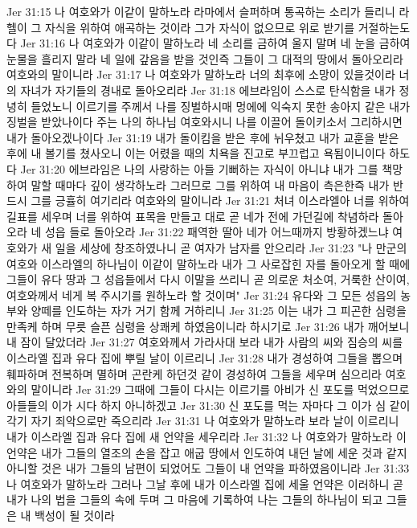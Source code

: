 Jer 31:15  나 여호와가 이같이 말하노라 라마에서 슬퍼하며 통곡하는 소리가 들리니 라헬이 그 자식을 위하여 애곡하는 것이라 그가 자식이 없으므로 위로 받기를 거절하는도다
Jer 31:16  나 여호와가 이같이 말하노라 네 소리를 금하여 울지 말며 네 눈을 금하여 눈물을 흘리지 말라 네 일에 갚음을 받을 것인즉 그들이 그 대적의 땅에서 돌아오리라 여호와의 말이니라
Jer 31:17  나 여호와가 말하노라 너의 최후에 소망이 있을것이라 너의 자녀가 자기들의 경내로 돌아오리라
Jer 31:18  에브라임이 스스로 탄식함을 내가 정녕히 들었노니 이르기를 주께서 나를 징벌하시매 멍에에 익숙지 못한 송아지 같은 내가 징벌을 받았나이다 주는 나의 하나님 여호와시니 나를 이끌어 돌이키소서 그리하시면 내가 돌아오겠나이다
Jer 31:19  내가 돌이킴을 받은 후에 뉘우쳤고 내가 교훈을 받은 후에 내 볼기를 쳤사오니 이는 어렸을 때의 치욕을 진고로 부끄럽고 욕됨이니이다 하도다
Jer 31:20  에브라임은 나의 사랑하는 아들 기뻐하는 자식이 아니냐 내가 그를 책망하여 말할 때마다 깊이 생각하노라 그러므로 그를 위하여 내 마음이 측은한즉 내가 반드시 그를 긍휼히 여기리라 여호와의 말이니라
Jer 31:21  처녀 이스라엘아 너를 위하여 길표를 세우며 너를 위하여 표목을 만들고 대로 곧 네가 전에 가던길에 착념하라 돌아오라 네 성읍 들로 돌아오라
Jer 31:22  패역한 딸아 네가 어느때까지 방황하겠느냐 여호와가 새 일을 세상에 창조하였나니 곧 여자가 남자를 안으리라
Jer 31:23  "나 만군의 여호와 이스라엘의 하나님이 이같이 말하노라 내가 그 사로잡힌 자를 돌아오게 할 때에 그들이 유다 땅과 그 성읍들에서 다시 이말을 쓰리니 곧 의로운 처소여, 거룩한 산이여, 여호와께서 네게 복 주시기를 원하노라 할 것이며"
Jer 31:24  유다와 그 모든 성읍의 농부와 양떼를 인도하는 자가 거기 함께 거하리니
Jer 31:25  이는 내가 그 피곤한 심령을 만족케 하며 무릇 슬픈 심령을 상쾌케 하였음이니라 하시기로
Jer 31:26  내가 깨어보니 내 잠이 달았더라
Jer 31:27  여호와께서 가라사대 보라 내가 사람의 씨와 짐승의 씨를 이스라엘 집과 유다 집에 뿌릴 날이 이르리니
Jer 31:28  내가 경성하여 그들을 뽑으며 훼파하며 전복하며 멸하며 곤란케 하던것 같이 경성하여 그들을 세우며 심으리라 여호와의 말이니라
Jer 31:29  그때에 그들이 다시는 이르기를 아비가 신 포도를 먹었으므로 아들들의 이가 시다 하지 아니하겠고
Jer 31:30  신 포도를 먹는 자마다 그 이가 심 같이 각기 자기 죄악으로만 죽으리라
Jer 31:31  나 여호와가 말하노라 보라 날이 이르리니 내가 이스라엘 집과 유다 집에 새 언약을 세우리라
Jer 31:32  나 여호와가 말하노라 이 언약은 내가 그들의 열조의 손을 잡고 애굽 땅에서 인도하여 내던 날에 세운 것과 같지 아니할 것은 내가 그들의 남편이 되었어도 그들이 내 언약을 파하였음이니라
Jer 31:33  나 여호와가 말하노라 그러나 그날 후에 내가 이스라엘 집에 세울 언약은 이러하니 곧 내가 나의 법을 그들의 속에 두며 그 마음에 기록하여 나는 그들의 하나님이 되고 그들은 내 백성이 될 것이라
